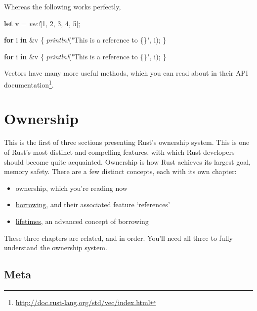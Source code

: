\documentclass[a4paper,]{book}
\newenvironment{Shaded}{\begin{snugshade}}{\end{snugshade}}
\newcommand{\KeywordTok}[1]{\textcolor[rgb]{0.13,0.29,0.53}{\textbf{{#1}}}}
\newcommand{\DecValTok}[1]{\textcolor[rgb]{0.00,0.00,0.81}{{#1}}}
\newcommand{\StringTok}[1]{\textcolor[rgb]{0.31,0.60,0.02}{{#1}}}
\newcommand{\PreprocessorTok}[1]{\textcolor[rgb]{0.56,0.35,0.01}{\textit{{#1}}}}
\newcommand{\NormalTok}[1]{{#1}}
\renewcommand{\href}[2]{#2\footnote{\url{#1}}}
\providecommand{\tightlist}{%
  \setlength{\itemsep}{0pt}\setlength{\parskip}{0pt}}
\begin{document}
Whereas the following works perfectly,

\begin{Shaded}
\begin{Highlighting}[]
\KeywordTok{let} \NormalTok{v = }\PreprocessorTok{vec!}\NormalTok{[}\DecValTok{1}\NormalTok{, }\DecValTok{2}\NormalTok{, }\DecValTok{3}\NormalTok{, }\DecValTok{4}\NormalTok{, }\DecValTok{5}\NormalTok{];}

\KeywordTok{for} \NormalTok{i }\KeywordTok{in} \NormalTok{&v \{}
    \PreprocessorTok{println!}\NormalTok{(}\StringTok{"This is a reference to \{\}"}\NormalTok{, i);}
\NormalTok{\}}

\KeywordTok{for} \NormalTok{i }\KeywordTok{in} \NormalTok{&v \{}
    \PreprocessorTok{println!}\NormalTok{(}\StringTok{"This is a reference to \{\}"}\NormalTok{, i);}
\NormalTok{\}}
\end{Highlighting}
\end{Shaded}

Vectors have many more useful methods, which you can read about in
\href{http://doc.rust-lang.org/std/vec/index.html}{their API
documentation}.

\hypertarget{sec--ownership}{\section{Ownership}\label{sec--ownership}}

This is the first of three sections presenting Rust's ownership system.
This is one of Rust's most distinct and compelling features, with which
Rust developers should become quite acquainted. Ownership is how Rust
achieves its largest goal, memory safety. There are a few distinct
concepts, each with its own chapter:

\begin{itemize}
\tightlist
\item
  ownership, which you're reading now
\item
  \protect\hyperlink{sec--references-and-borrowing}{borrowing}, and
  their associated feature `references'
\item
  \protect\hyperlink{sec--lifetimes}{lifetimes}, an advanced concept of
  borrowing
\end{itemize}

These three chapters are related, and in order. You'll need all three to
fully understand the ownership system.

\subsection{Meta}\label{meta}
\end{document}
